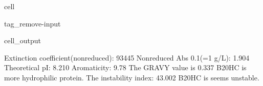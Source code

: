 \documentclass[letterpaper,10pt,english]{jupyterBook}
\begin{document}
\begin{sphinxuseclass}{cell}
\begin{sphinxuseclass}{tag_remove-input}
\begin{sphinxVerbatimOutput}
\begin{sphinxuseclass}{cell_output}
\begin{sphinxVerbatim}[commandchars=\\\{\}]
\PYGZsh{} Extinction coefficient(non\PYGZhy{}reduced): \PYGZhy{}\PYGZhy{}\PYGZhy{}\PYGZhy{}\PYGZhy{}\PYGZhy{}\PYGZhy{}\PYGZhy{}\PYGZhy{}\PYGZhy{}\PYGZhy{}\PYGZhy{}\PYGZhy{}\PYGZhy{}\PYGZhy{}\PYGZhy{}\PYGZhy{}\PYGZhy{}\PYGZhy{}\PYGZhy{}\PYGZhy{}\PYGZhy{}93445
\PYGZsh{} Non\PYGZhy{}reduced Abs 0.1\PYGZpc{}(=1 g/L): \PYGZhy{}\PYGZhy{}\PYGZhy{}\PYGZhy{}\PYGZhy{}\PYGZhy{}\PYGZhy{}\PYGZhy{}\PYGZhy{}\PYGZhy{}\PYGZhy{}\PYGZhy{}\PYGZhy{}\PYGZhy{}\PYGZhy{}\PYGZhy{}\PYGZhy{}\PYGZhy{}\PYGZhy{}\PYGZhy{}\PYGZhy{}\PYGZhy{}\PYGZhy{}\PYGZhy{}\PYGZhy{}\PYGZhy{}\PYGZhy{}\PYGZhy{}\PYGZhy{}1.904
\PYGZsh{} Theoretical pI: \PYGZhy{}\PYGZhy{}\PYGZhy{}\PYGZhy{}\PYGZhy{}\PYGZhy{}\PYGZhy{}\PYGZhy{}\PYGZhy{}\PYGZhy{}\PYGZhy{}\PYGZhy{}\PYGZhy{}\PYGZhy{}\PYGZhy{}\PYGZhy{}\PYGZhy{}\PYGZhy{}\PYGZhy{}\PYGZhy{}\PYGZhy{}\PYGZhy{}\PYGZhy{}\PYGZhy{}\PYGZhy{}\PYGZhy{}\PYGZhy{}\PYGZhy{}\PYGZhy{}\PYGZhy{}\PYGZhy{}\PYGZhy{}\PYGZhy{}\PYGZhy{}\PYGZhy{}\PYGZhy{}\PYGZhy{}\PYGZhy{}\PYGZhy{}\PYGZhy{}\PYGZhy{}\PYGZhy{}\PYGZhy{}8.210
\PYGZsh{} Aromaticity: \PYGZhy{}\PYGZhy{}\PYGZhy{}\PYGZhy{}\PYGZhy{}\PYGZhy{}\PYGZhy{}\PYGZhy{}\PYGZhy{}\PYGZhy{}\PYGZhy{}\PYGZhy{}\PYGZhy{}\PYGZhy{}\PYGZhy{}\PYGZhy{}\PYGZhy{}\PYGZhy{}\PYGZhy{}\PYGZhy{}\PYGZhy{}\PYGZhy{}\PYGZhy{}\PYGZhy{}\PYGZhy{}\PYGZhy{}\PYGZhy{}\PYGZhy{}\PYGZhy{}\PYGZhy{}\PYGZhy{}\PYGZhy{}\PYGZhy{}\PYGZhy{}\PYGZhy{}\PYGZhy{}\PYGZhy{}\PYGZhy{}\PYGZhy{}\PYGZhy{}\PYGZhy{}\PYGZhy{}\PYGZhy{}\PYGZhy{}\PYGZhy{}\PYGZhy{}9.78\PYGZpc{}
\PYGZsh{} The GRAVY value is \PYGZhy{}\PYGZhy{}\PYGZhy{}\PYGZhy{}\PYGZhy{}\PYGZhy{}\PYGZhy{}\PYGZhy{}\PYGZhy{}\PYGZhy{}\PYGZhy{}\PYGZhy{}\PYGZhy{}\PYGZhy{}\PYGZhy{}\PYGZhy{}\PYGZhy{}\PYGZhy{}\PYGZhy{}\PYGZhy{}\PYGZhy{}\PYGZhy{}\PYGZhy{}\PYGZhy{}\PYGZhy{}\PYGZhy{}\PYGZhy{}\PYGZhy{}\PYGZhy{}\PYGZhy{}\PYGZhy{}\PYGZhy{}\PYGZhy{}\PYGZhy{}\PYGZhy{}\PYGZhy{}\PYGZhy{}\PYGZhy{}\PYGZhy{}\PYGZhy{}0.337
  B20\PYGZus{}HC is more hydrophilic protein.
\PYGZsh{} The instability index: \PYGZhy{}\PYGZhy{}\PYGZhy{}\PYGZhy{}\PYGZhy{}\PYGZhy{}\PYGZhy{}\PYGZhy{}\PYGZhy{}\PYGZhy{}\PYGZhy{}\PYGZhy{}\PYGZhy{}\PYGZhy{}\PYGZhy{}\PYGZhy{}\PYGZhy{}\PYGZhy{}\PYGZhy{}\PYGZhy{}\PYGZhy{}\PYGZhy{}\PYGZhy{}\PYGZhy{}\PYGZhy{}\PYGZhy{}\PYGZhy{}\PYGZhy{}\PYGZhy{}\PYGZhy{}\PYGZhy{}\PYGZhy{}\PYGZhy{}\PYGZhy{}\PYGZhy{}43.002
  B20\PYGZus{}HC is seems unstable.
\end{sphinxVerbatim}

\end{sphinxuseclass}\end{sphinxVerbatimOutput}

\end{sphinxuseclass}
\end{sphinxuseclass}
\end{document}
